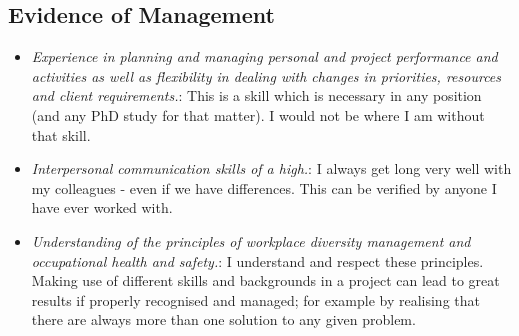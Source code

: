 \documentclass[12pt,a4paper]{article}
\begin{document}
\subsection*{Evidence of Management}
\begin{itemize} 
  \item \textit{Experience in planning and managing personal and project performance and activities as well as flexibility in dealing with changes in priorities, resources and client requirements.}:
  This is a skill which is necessary in any position 
  (and any PhD study for that matter).
  I would not be where I am without that skill.
  
  \item \textit{Interpersonal communication skills of a high.}: 
  I always get long very well with my colleagues - even if we have differences.
  This can be verified by anyone I have ever worked with.
  
  \item \textit{Understanding of the principles of workplace diversity management and 
  occupational health and safety.}:  
  I understand and respect these principles.
  Making use of different skills and backgrounds in a project can lead to great results if 
  properly recognised and managed; for example by realising that there are always more than 
  one solution to any given problem.
\end{itemize} 
   
\end{document}
